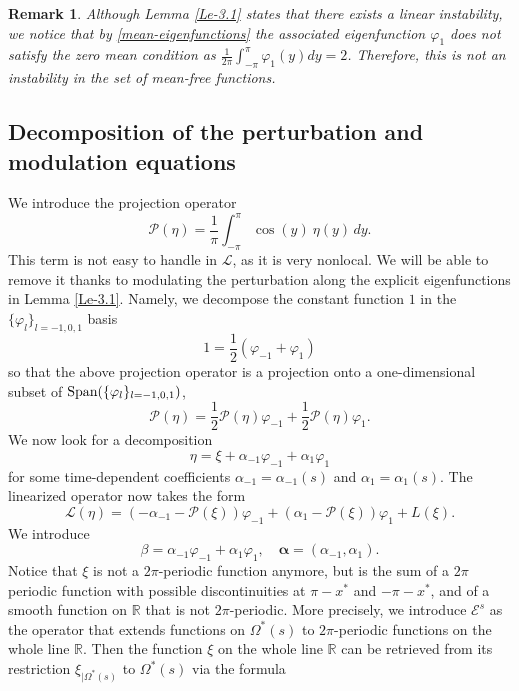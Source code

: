 \documentclass[12pt]{amsart}
\numberwithin{equation}{section}
\numberwithin{equation}{section}
\newtheorem{rmk}[thm]{Remark}
\begin{document}
\begin{rmk}
Although Lemma \ref{Le-3.1} states that there exists a linear instability, we notice that by \eqref{mean-eigenfunctions} the associated eigenfunction $\varphi_{1}$ does not satisfy the zero mean condition as $\frac{1}{2\pi}\int_{-\pi}^\pi \varphi_{1}(y)dy=2$. Therefore, this is not an instability in the set of mean-free functions.
\end{rmk}





  
\subsection{Decomposition of the perturbation and modulation equations}\label{subs4.3}

We introduce the projection operator
$$
\mathcal{P}(\eta)=   \frac{1}{\pi}  \int_{-\pi}^{\pi}\cos( y) \ \eta(y) \,dy .
$$
This term is not easy to handle in $\mathcal L$, as it is very nonlocal. We will be able to remove it thanks to modulating the perturbation along the explicit eigenfunctions in Lemma \ref{Le-3.1}. Namely, we decompose the constant function $1$ in the $\{\varphi_l\}_{l=-1,0,1}$ basis
$$
1 = \frac{1}{2} (\varphi_{-1}+\varphi_1)
$$
so that the above projection operator is a projection onto a one-dimensional subset of $\textup{Span}(\{\varphi_l\}_{l=-1,0,1})$,
$$
\mathcal{P}(\eta)=  \frac 12 \mathcal{P}(\eta) \varphi_{-1}+\frac 12 \mathcal{P}(\eta) \varphi_1.
$$
We now look for a decomposition
$$
\eta=\xi+ \alpha_{-1}\varphi_{-1}+\alpha_1 \varphi_1
$$
for some time-dependent coefficients $\alpha_{-1}=\alpha_{-1}(s)$ and $\alpha_{1}=\alpha_1(s)$. The linearized operator now takes the form
$$
\mathcal L(\eta) = \left( -\alpha_{-1}-\mathcal{P}(\xi) \right)\varphi_{-1}+\left( \alpha_1 - \mathcal{P}(\xi)\right) \varphi_1 +L( \xi) .
$$
We introduce
\begin{equation}\label{e.defbeta}
\beta=\alpha_{-1}\varphi_{-1}+\alpha_1 \varphi_1,\quad \boldsymbol{\alpha}=(\alpha_{-1}, \alpha_1).
\end{equation}
Notice that $\xi$ is not a $2\pi$-periodic function anymore, but is the sum of a $2\pi$ periodic function with possible discontinuities at $\pi-x^*$ and $-\pi-x^*$, and of a smooth function on $\mathbb R$ that is not $2\pi$-periodic. More precisely, we introduce $\mathcal E^s$ as the operator that extends functions on $\Omega^*(s)$ to $2\pi$-periodic functions on the whole line $\mathbb R$. Then the function $\xi$ on the whole line $\mathbb R$ can be retrieved from its restriction $\xi_{|\Omega^*(s)}$ to $\Omega^*(s)$ via the formula
\end{document}
